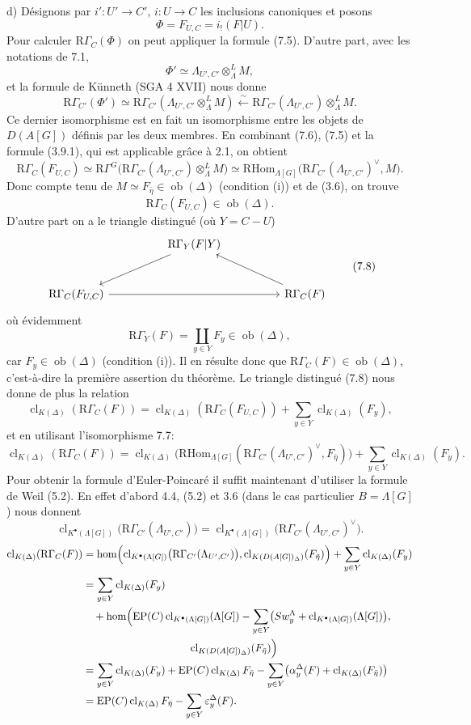 \documentclass[11pt]{article}
\newcommand{\R}{\mathrm{R}}\newcommand{\RHomCore}{\mathrm{RHom}}
\providecommand{\RHom}{\RHomCore}
\providecommand{\cl}{\operatorname{cl}}
\providecommand{\EP}{\operatorname{EP}}
\providecommand{\Ob}{\operatorname{ob}}
\providecommand{\RHom}{\RHomCore}
\providecommand{\RHom}{\R\mathcal{H}om}
\providecommand{\Ob}{\operatorname{ob}}
\providecommand{\R}{\mathrm R}
\providecommand{\cl}{\operatorname{cl}}
\providecommand{\EP}{\operatorname{EP}}
\providecommand{\Ob}{\operatorname{Ob}}
\providecommand{\clK}[1]{\operatorname{cl}_{K(#1)}}
\providecommand{\clKstar}[1]{\operatorname{cl}_{K^{\bullet}(#1)}}
\providecommand{\RG}{\R\Gamma}
\providecommand{\RHom}{\RHomCore}
\providecommand{\cl}{\operatorname{cl}}
\providecommand{\Ob}{\operatorname{ob}}
\providecommand{\Ob}{\operatorname{Ob}}
\begin{document}
d) Désignons par $i':U'\to C'$, $i:U\to C$ les inclusions canoniques et posons
\[
\Phi=F_{U,C}=i_!(F|U).
\]
Pour calculer $\RG_C(\Phi)$ on peut appliquer la formule (7.5). D'autre part, avec les notations de 7.1,
\[
\Phi'\simeq \Lambda_{U',C'}\otimes_\Lambda^L M,
\]
et la formule de Künneth (SGA 4 XVII) nous donne
\[
\RG_{C'}(\Phi')
\simeq
\RG_{C'}(\Lambda_{U',C'}\otimes_\Lambda^L M)
\xleftarrow{\sim}
\RG_{C'}(\Lambda_{U',C'})\otimes_\Lambda^L M.
\tag{7.6}
\]
Ce dernier isomorphisme est en fait un isomorphisme entre les objets de $D(A[G])$ définis par les deux membres. En combinant (7.6), (7.5) et la formule (3.9.1), qui est applicable grâce à 2.1, on obtient
\[
\RG_C(F_{U,C})
\simeq
\R\Gamma^G\bigl(\RG_{C'}(\Lambda_{U',C'})\otimes_\Lambda^L M\bigr)
\simeq
\RHom_{\Lambda[G]}\bigl(\RG_{C'}(\Lambda_{U',C'})^\vee,M\bigr).
\tag{7.7}
\]
Donc compte tenu de $M\simeq F_{\bar\eta}\in\Ob(\Delta)$ (condition (i)) et de (3.6), on trouve
\[
\RG_C(F_{U,C})\in\Ob(\Delta).
\]
D'autre part on a le triangle distingué (où $Y=C-U$)
\[
\begin{tikzcd}[column sep=huge,row sep=large]
& \RG_Y(F|Y) \arrow[dl] & \\
\RG_C(F_{U,C}) \arrow[rr] && \RG_C(F) \arrow[ul]
\end{tikzcd}
\tag{7.8}
\]
où évidemment
\[
\RG_Y(F)=\coprod_{y\in Y}F_y\in\Ob(\Delta),
\]
car $F_y\in\Ob(\Delta)$ (condition (i)). Il en résulte donc que $\RG_C(F)\in\Ob(\Delta)$, c'est-à-dire la première assertion du théorème. Le triangle distingué (7.8) nous donne de plus la relation
\[
\clK{\Delta}(\RG_C(F))
=
\clK{\Delta}(\RG_C(F_{U,C}))
+\sum_{y\in Y}\clK{\Delta}(F_y),
\]
et en utilisant l'isomorphisme 7.7:
\[
\clK{\Delta}(\RG_C(F))
=
\clK{\Delta}\bigl(\RHom_{\Lambda[G]}(\RG_{C'}(\Lambda_{U',C'})^\vee,F_{\bar\eta})\bigr)
+\sum_{y\in Y}\clK{\Delta}(F_y).
\]
Pour obtenir la formule d'Euler-Poincaré il suffit maintenant d'utiliser la formule de Weil (5.2). En effet d'abord 4.4, (5.2) et 3.6 (dans le cas particulier $B=\Lambda[G]$) nous donnent
\[
\clKstar{\Lambda[G]}\bigl(\RG_{C'}(\Lambda_{U',C'})\bigr)
=
\clKstar{\Lambda[G]}\bigl(\RG_{C'}(\Lambda_{U',C'})^\vee\bigr).
\]
\[
\begin{aligned}
\clK{\Delta}(\RG_C(F))
&=\operatorname{hom}\Bigl(
\clKstar{\Lambda[G]}\bigl(\RG_{C'}(\Lambda_{U',C'})\bigr),
\cl_{K(D(A[G])_\Delta)}(F_{\bar\eta})\Bigr)
 +\sum_{y\in Y}\clK{\Delta}(F_y)\\
&=\sum_{y\in Y}\clK{\Delta}(F_y)\\
&\quad +\operatorname{hom}\Bigl(
\EP(C)\clKstar{\Lambda[G]}(\Lambda[G])
 -\sum_{y\in Y}\bigl(Sw_y^{\Lambda}+\clKstar{\Lambda[G]}(\Lambda[G])\bigr),\\
&\hspace{10em}\cl_{K(D(A[G])_\Delta)}(F_{\bar\eta})\Bigr)\\
&=\sum_{y\in Y}\clK{\Delta}(F_y)
 +\EP(C)\clK{\Delta}F_{\bar\eta}
 -\sum_{y\in Y}\bigl(\alpha_y^\Delta(F)+\clK{\Delta}(F_{\bar\eta})\bigr)\\
&=\EP(C)\clK{\Delta}F_{\bar\eta}
 -\sum_{y\in Y}\varepsilon_y^\Delta(F).
\end{aligned}
\]
\end{document}

